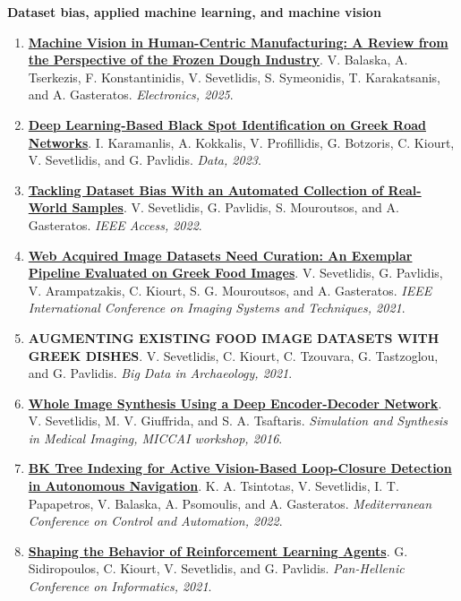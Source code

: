\documentclass[11pt,a4paper]{article}
\newcommand{\paper}[4]{%
  \item \textbf{\href{#4}{#1}}. #2. \textit{#3}.
}
\newcommand{\paperplain}[3]{%
  \item \textbf{#1}. #2. \textit{#3}.
}
\begin{document}
\textbf{Dataset bias, applied machine learning, and machine vision}
\begin{enumerate}
  \paper{Machine Vision in Human-Centric Manufacturing: A Review from the Perspective of the Frozen Dough Industry}{V. Balaska, A. Tserkezis, F. Konstantinidis, V. Sevetlidis, S. Symeonidis, T. Karakatsanis, and A. Gasteratos}{Electronics, 2025}{https://doi.org/10.3390/electronics14173361}
  \paper{Deep Learning-Based Black Spot Identification on Greek Road Networks}{I. Karamanlis, A. Kokkalis, V. Profillidis, G. Botzoris, C. Kiourt, V. Sevetlidis, and G. Pavlidis}{Data, 2023}{https://doi.org/10.3390/data8060110}
  \paper{Tackling Dataset Bias With an Automated Collection of Real-World Samples}{V. Sevetlidis, G. Pavlidis, S. Mouroutsos, and A. Gasteratos}{IEEE Access, 2022}{https://doi.org/10.1109/ACCESS.2022.3226517}
  \paper{Web Acquired Image Datasets Need Curation: An Exemplar Pipeline Evaluated on Greek Food Images}{V. Sevetlidis, G. Pavlidis, V. Arampatzakis, C. Kiourt, S. G. Mouroutsos, and A. Gasteratos}{IEEE International Conference on Imaging Systems and Techniques, 2021}{https://ieeexplore.ieee.org/abstract/document/9651419}
  \paperplain{AUGMENTING EXISTING FOOD IMAGE DATASETS WITH GREEK DISHES}{V. Sevetlidis, C. Kiourt, C. Tzouvara, G. Tastzoglou, and G. Pavlidis}{Big Data in Archaeology, 2021}
  \paper{Whole Image Synthesis Using a Deep Encoder-Decoder Network}{V. Sevetlidis, M. V. Giuffrida, and S. A. Tsaftaris}{Simulation and Synthesis in Medical Imaging, MICCAI workshop, 2016}{https://doi.org/10.1007/978-3-319-46630-9_13}
  \paper{BK Tree Indexing for Active Vision-Based Loop-Closure Detection in Autonomous Navigation}{K. A. Tsintotas, V. Sevetlidis, I. T. Papapetros, V. Balaska, A. Psomoulis, and A. Gasteratos}{Mediterranean Conference on Control and Automation, 2022}{https://ieeexplore.ieee.org/document/9837138/}
  \paper{Shaping the Behavior of Reinforcement Learning Agents}{G. Sidiropoulos, C. Kiourt, V. Sevetlidis, and G. Pavlidis}{Pan-Hellenic Conference on Informatics, 2021}{https://doi.org/10.1145/3503823.3503905}
\end{enumerate}
\end{document}
